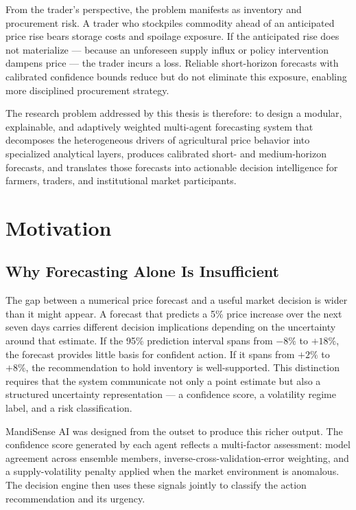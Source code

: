 \documentclass[12pt,a4paper]{report}
\begin{document}
From the trader's perspective, the problem manifests as inventory and procurement risk. A trader who stockpiles commodity ahead of an anticipated price rise bears storage costs and spoilage exposure. If the anticipated rise does not materialize — because an unforeseen supply influx or policy intervention dampens price — the trader incurs a loss. Reliable short-horizon forecasts with calibrated confidence bounds reduce but do not eliminate this exposure, enabling more disciplined procurement strategy.

The research problem addressed by this thesis is therefore: to design a modular, explainable, and adaptively weighted multi-agent forecasting system that decomposes the heterogeneous drivers of agricultural price behavior into specialized analytical layers, produces calibrated short- and medium-horizon forecasts, and translates those forecasts into actionable decision intelligence for farmers, traders, and institutional market participants.

\section{Motivation}

\subsection{Why Forecasting Alone Is Insufficient}

The gap between a numerical price forecast and a useful market decision is wider than it might appear. A forecast that predicts a 5\% price increase over the next seven days carries different decision implications depending on the uncertainty around that estimate. If the 95\% prediction interval spans from $-8\%$ to $+18\%$, the forecast provides little basis for confident action. If it spans from $+2\%$ to $+8\%$, the recommendation to hold inventory is well-supported. This distinction requires that the system communicate not only a point estimate but also a structured uncertainty representation — a confidence score, a volatility regime label, and a risk classification.

MandiSense AI was designed from the outset to produce this richer output. The confidence score generated by each agent reflects a multi-factor assessment: model agreement across ensemble members, inverse-cross-validation-error weighting, and a supply-volatility penalty applied when the market environment is anomalous. The decision engine then uses these signals jointly to classify the action recommendation and its urgency.
\end{document}
